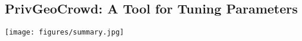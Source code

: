 \documentclass{USC-Thesis}
\newcommand{\tn}{\tabularnewline}
\newcommand{\PGC}{{PrivGeoCrowd}}
\numberwithin{equation}{chapter}
\begin{document}
\begin{comment}
\textbf{Redundant task assignment (Single-snapshot PSD).}

\begin{table}
\begin{center}
\footnotesize
\begin{tabular}{ l | c | c | c | c | r}
\textbf{$K$} & \textbf{$\mathit{ANW}$} & \textbf{$\mathit{HOP}$} & \textbf{$\mathit{WTD_{NN}}$} & \textbf{$\mathit{WTD_{FC}}$} & \textbf{$\mathit{CELL}$} \tn
\hline
2 & 55.1 & 16.2 & 0.24 & 0.38 & 4.6 \tn
3 & 88.1 & 23.7 & 0.28 & 0.52 & 7.0 \tn
4 & 117.4 & 28.1 & 0.32 & 0.56 & 7.8 \tn
5 & 145.2 & 30.0 & 0.37 & 0.61 & 8.5 \tn
\end{tabular}
\caption{Performance of $G$-$\mathit{GP}$-$\mathit{Hybrid}$ when varying number of workers required to complete a task  $K$ (Ye.-Linear, $\epsilon=0.4$).}
\label{tab:single_PSD_K}
\end{center}
\end{table}

\textbf{Redundant task assignment (Multiple-snapshot PSD).}

\begin{table}
\begin{center}
\footnotesize
\begin{tabular}{ l | c | c | c | c | r}
\textbf{$K$} & \textbf{$\mathit{ANW}$} & \textbf{$\mathit{HOP}$} & \textbf{$\mathit{WTD}$} & \textbf{$\mathit{ASR}$} & \textbf{$\mathit{CELL}$} \tn
\hline
2 & 63.1 & 19.8 & 0.46 & 84.5 & 0.38 \tn
3 & 94.7 & 25.3 & 0.47 & 81.4& 0.52 \tn
4 & 137.4 & 31.4 & 0.46 & 80.7 & 0.56 \tn
5 & 195.4 & 37.4 & 0.46 & 80.10& 0.61  \tn
\end{tabular}
\caption{Performance of $Kalman$-$PID$ when varying number of workers required to complete a task $K$ (Ye.-Linear, $\epsilon=0.5$).}
\label{tab:mulltiple_PSD_K}
\end{center}
\end{table}

\end{comment}

\subsection{P\lowercase{riv}G\lowercase{eo}C\lowercase{rowd}: A Tool for Tuning Parameters}
\label{sec:software}

\begin{figure*}[!htb]\centering
  \texttt{[image: figures/summary.jpg]}
  \caption{\PGC\ main GUI integrates several component module panels}
  \label{fig:main}
\end{figure*}
\end{document}
